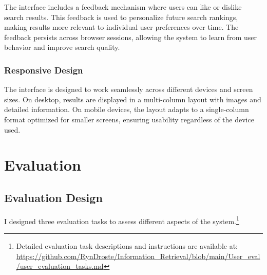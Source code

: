 \documentclass[11pt,a4paper]{article}
\begin{document}
The interface includes a feedback mechanism where users can like or dislike search results. This feedback is used to personalize future search rankings, making results more relevant to individual user preferences over time. The feedback persists across browser sessions, allowing the system to learn from user behavior and improve search quality.

\subsubsection{Responsive Design}

The interface is designed to work seamlessly across different devices and screen sizes. On desktop, results are displayed in a multi-column layout with images and detailed information. On mobile devices, the layout adapts to a single-column format optimized for smaller screens, ensuring usability regardless of the device used.

\section{Evaluation}

\subsection{Evaluation Design}

I designed three evaluation tasks to assess different aspects of the system.\footnote{Detailed evaluation task descriptions and instructions are available at: \url{https://github.com/RynDroste/Information_Retrieval/blob/main/User_eval/user_evaluation_tasks.md}}
\end{document}
